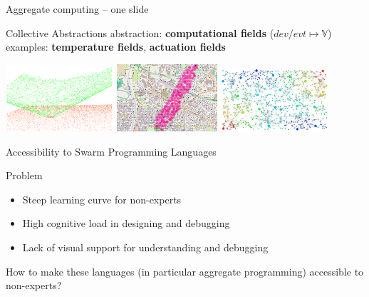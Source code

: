 \documentclass[aspectratio=169]{beamer}
\newcommand{\bo}[1]{\textbf{#1}}
\begin{document}
\begin{frame}[fragile]{Aggregate computing -- one slide}
{  
		\begin{exampleblock}{\footnotesize Collective Abstractions} %
			\scriptsize
		\alert{abstraction:} \bo{computational fields} ($\mathit{dev/evt} \mapsto \mathbb{V}$) \vspace{0.1cm}
			\alert{examples:} \bo{temperature fields}, \bo{actuation fields} \vspace{0.1cm}
			\begin{center}
				\includegraphics[width=0.3\textwidth]{img/3d-gradient.png}
				\includegraphics[width=0.28\textwidth]{img/channel.png}
				\includegraphics[width=0.3\textwidth]{img/scr-result.png}
				\end{center}
		\end{exampleblock}
 }
	
\end{frame}
\begin{frame}{Accessibility to Swarm Programming Languages}
	\begin{block}{Problem}
		\begin{itemize}
			\item \alert{Steep learning curve} for non-experts
			\item \alert{High cognitive load} in designing and debugging
			\item \alert{Lack of visual support} for understanding and debugging
		\end{itemize}
	\end{block}
	How to make these languages (in particular aggregate programming) accessible to non-experts?
\end{frame}
\end{document}
